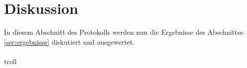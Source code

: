 \chapter{Diskussion}
\label{sec:diskussion}
In diesem Abschnitt des Protokolls werden nun die Ergebnisse des Abschnittes \ref{sec:ergebnisse} diskutiert und ausgewertet.\\\\


  

 





 troll


